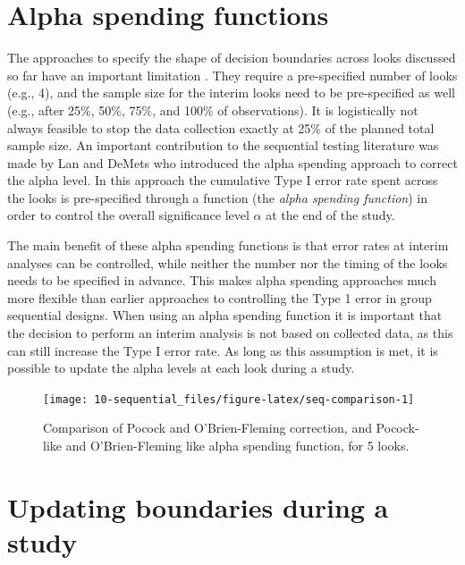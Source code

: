 \documentclass[
  oneside]{book}
\begin{document}
\hypertarget{alpha-spending-functions}{%
\section{Alpha spending functions}\label{alpha-spending-functions}}

The approaches to specify the shape of decision boundaries across looks discussed so far have an important limitation \citep{proschan_statistical_2006}. They require a pre-specified number of looks (e.g., 4), and the sample size for the interim looks need to be pre-specified as well (e.g., after 25\%, 50\%, 75\%, and 100\% of observations). It is logistically not always feasible to stop the data collection exactly at 25\% of the planned total sample size. An important contribution to the sequential testing literature was made by Lan and DeMets \citeyearpar{lan_discrete_1983} who introduced the alpha spending approach to correct the alpha level. In this approach the cumulative Type I error rate spent across the looks is pre-specified through a function (the \emph{alpha spending function}) in order to control the overall significance level \(\alpha\) at the end of the study.

The main benefit of these alpha spending functions is that error rates at interim analyses can be controlled, while neither the number nor the timing of the looks needs to be specified in advance. This makes alpha spending approaches much more flexible than earlier approaches to controlling the Type 1 error in group sequential designs. When using an alpha spending function it is important that the decision to perform an interim analysis is not based on collected data, as this can still increase the Type I error rate. As long as this assumption is met, it is possible to update the alpha levels at each look during a study.



\begin{figure}

{\centering \texttt{[image: 10-sequential\_files/figure-latex/seq-comparison-1]} 

}

\caption{Comparison of Pocock and O'Brien-Fleming correction, and Pocock-like and O'Brien-Fleming like alpha spending function, for 5 looks.}\label{fig:seq-comparison}
\end{figure}

\hypertarget{updating-boundaries-during-a-study}{%
\section{Updating boundaries during a study}\label{updating-boundaries-during-a-study}}
\end{document}
